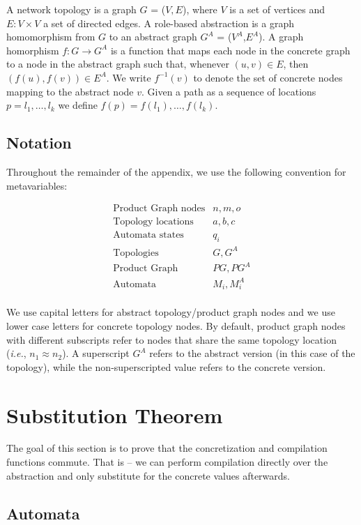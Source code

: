 \documentclass[twocolumn]{sig-alternate-10pt}
\newcommand{\IE}{\emph{i.e.}}
\begin{document}
A network topology is a graph $G$ = ($V, E$), where $V$ is a set of vertices and $E \colon V \times V$ a set of directed edges. A role-based abstraction is a graph homomorphism from $G$ to an abstract graph $G^A$ = ($V^A$,$E^A$). A graph homorphism $f : G \rightarrow G^A$ is a function that maps each node in the concrete graph to a node in the abstract graph such that, whenever $(u,v) \in E$, then $(f(u),f(v)) \in E^A$. We write $f^{-1}(v)$ to denote the set of concrete nodes mapping to the abstract node $v$. Given a path as a sequence of locations $p = l_1, \dots, l_k$ we define $f(p) = f(l_1), \dots, f(l_k)$.


\subsection{Notation}

Throughout the remainder of the appendix, we use the following convention for metavariables:

\[ \begin{array}{ll}
  \text{Product Graph nodes} & n,m,o \\
  \text{Topology locations} & a,b,c \\
  \text{Automata states} & q_i \\
  \text{Topologies} & G, G^A \\
  \text{Product Graph} & PG, PG^A \\
  \text{Automata} & M_i, M_i^A \\
\end{array} \]

We use capital letters for abstract topology/product graph nodes and we use lower case letters for concrete topology nodes. By default, product graph nodes with different subscripts refer to nodes that share the same topology location (\IE, $n_1 \approx n_2$). A superscript $G^A$ refers to the abstract version (in this case of the topology), while the non-superscripted value refers to the concrete version.


\section{Substitution Theorem}

The goal of this section is to prove that the concretization and compilation functions commute. That is -- we can perform compilation directly over the abstraction and only substitute for the concrete values afterwards.

\subsection{Automata}
\end{document}
